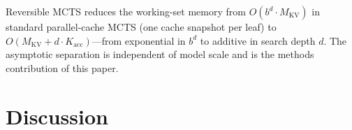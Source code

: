 \documentclass{article}
\begin{document}
Reversible MCTS reduces the working-set memory from $O(b^d \cdot M_{\text{KV}})$ in standard parallel-cache MCTS (one cache snapshot per leaf) to $O(M_{\text{KV}} + d \cdot K_{\text{acc}})$---from exponential in $b^d$ to additive in search depth $d$. The asymptotic separation is independent of model scale and is the methods contribution of this paper.

\section{Discussion}

\end{document}
